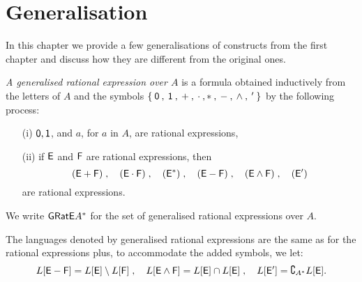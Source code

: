 \chapter{Generalisation}

In this chapter we provide a few generalisations of constructs from the first chapter and discuss how they are different from the original ones.

\begin{defn}
    \emph{A generalised rational expression over $A$} is a formula obtained inductively from the letters of $A$ and the symbols $\{ \: {\mathsf{0}} \: , \: {\mathsf{1}} \: , \: + \: , \: \cdot \: , * \: , \: - \: , \: \wedge \: , \: ^{\prime} \: \}$ by the following process:
    \begin{itemize}
        \item[(i)] ${\mathsf{0}}, {\mathsf{1}}$, and $a$, for $a$ in $A$, are rational expressions,
        \item[(ii)] if ${\mathsf{E}}$ and ${\mathsf{F}}$ are rational expressions, then
            \[
                ({\mathsf{E}} + {\mathsf{F}}) \; , \quad ({\mathsf{E}} \cdot {\mathsf{F}}) \; , \quad ({\mathsf{E}}^*) \; , \quad ({\mathsf{E}} - {\mathsf{F}}) \; , \quad ({\mathsf{E}} \wedge {\mathsf{F}}) \; , \quad ({\mathsf{E}}^{\prime})
            \]
             are rational expressions.
    \end{itemize}
    We write ${\mathsf{GRatE}} A^*$ for the set of generalised rational expressions over $A$.
\end{defn}

The languages denoted by generalised rational expressions are the same as for the rational expressions plus, to accommodate the added symbols, we let:
\[
    L[{\mathsf{E}} - {\mathsf{F}}] = L[{\mathsf{E}}] \setminus L[{\mathsf{F}}] \; , \quad L[{\mathsf{E}} \wedge {\mathsf{F}}] = L[{\mathsf{E}}] \cap L[{\mathsf{E}}] \; , \quad L[{\mathsf{E}}^{\prime}] = \complement_{A^*} L[{\mathsf{E}}].
\]


